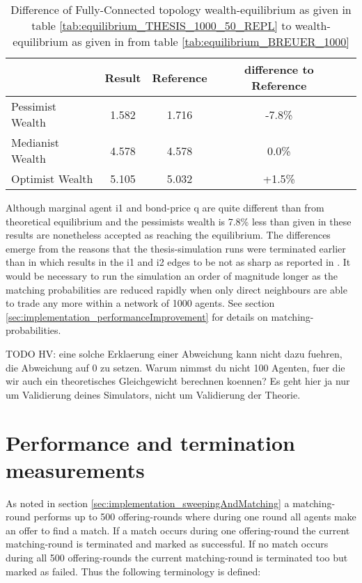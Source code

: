 \documentclass[Bachelorarbeit.tex]{subfiles}
\begin{document}
\begin{table}[H]
	\caption{Difference of Fully-Connected topology wealth-equilibrium as given in table \ref{tab:equilibrium_THESIS_1000_50_REPL} to wealth-equilibrium as given in \cite{Breuer2015} from table \ref{tab:equilibrium_BREUER_1000}}
	\centering
	\begin{tabular} { l c c c r }
		& Result & Reference & difference to Reference \\
		\hline
		Pessimist Wealth  & 1.582 & 1.716 & -7.8\% \\
		Medianist Wealth & 4.578 & 4.578 & 0.0\% \\
		Optimist Wealth & 5.105 & 5.032 & +1.5\% \\
		\hline
	\end{tabular}
\end{table} 

Although marginal agent i1 and bond-price q are quite different than from theoretical equilibrium and the pessimists wealth is 7.8\% less than given in \cite{Breuer2015} these results are nonetheless accepted as reaching the equilibrium. The differences emerge from the reasons that the thesis-simulation runs were terminated earlier than in \cite{Breuer2015} which results in the i1 and i2 edges to be not as sharp as reported in \cite{Breuer2015}. It would be necessary to run the simulation an order of magnitude longer as the matching probabilities are reduced rapidly when only direct neighbours are able to trade any more within a network of 1000 agents. See section \ref{sec:implementation_performanceImprovement} for details on matching-probabilities.

TODO HV: eine solche Erklaerung einer Abweichung kann nicht dazu fuehren, die Abweichung auf 0 zu setzen. Warum nimmst du nicht 100 Agenten, fuer die wir auch ein theoretisches Gleichgewicht berechnen koennen? Es geht hier ja nur um Validierung deines Simulators, nicht um Validierung der Theorie.

\section{Performance and termination measurements}
As noted in section \ref{sec:implementation_sweepingAndMatching} a matching-round performs up to 500 offering-rounds where during one round all agents make an offer to find a match. If a match occurs during one offering-round the current matching-round is terminated and marked as successful. If no match occurs during all 500 offering-rounds the current matching-round is terminated too but marked as failed. Thus the following terminology is defined:
\end{document}
